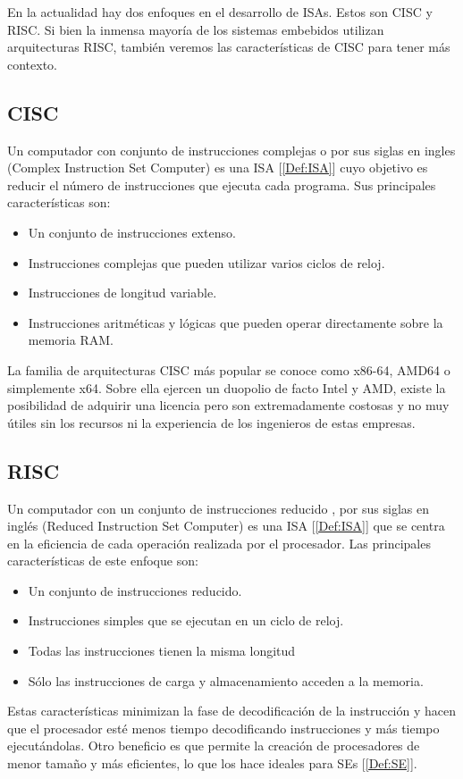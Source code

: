 En la actualidad hay dos enfoques en el desarrollo de ISAs. Estos son CISC y RISC. Si bien la inmensa mayoría de los sistemas embebidos utilizan arquitecturas RISC, también veremos las características de CISC para tener más contexto.

\subsection{CISC}
Un computador con conjunto de instrucciones complejas o  por sus siglas en ingles (Complex Instruction Set Computer) es una ISA [\ref{Def:ISA}] cuyo objetivo es reducir el número de instrucciones que ejecuta cada programa. Sus principales características son:
\begin{itemize}
    \item Un conjunto de instrucciones extenso.
    \item Instrucciones complejas que pueden utilizar varios ciclos de reloj.
    \item Instrucciones de longitud variable.
    \item Instrucciones aritméticas y lógicas que pueden operar directamente sobre la memoria RAM.
\end{itemize}

La familia de arquitecturas CISC más popular se conoce como x86-64, AMD64 o simplemente x64. Sobre ella ejercen un duopolio de facto Intel y AMD, existe la posibilidad de adquirir una licencia pero son extremadamente costosas y no muy útiles sin los recursos ni la experiencia de los ingenieros de estas empresas.

\subsection{RISC}
Un computador con un conjunto de instrucciones reducido , por sus siglas en inglés (Reduced Instruction Set Computer) es una ISA [\ref{Def:ISA}] que se centra en la eficiencia de cada operación realizada por el procesador. Las principales características de este enfoque son:
\begin{itemize}
    \item Un conjunto de instrucciones reducido.
    \item Instrucciones simples que se ejecutan en un ciclo de reloj.
    \item Todas las instrucciones tienen la misma longitud
    \item Sólo las instrucciones de carga y almacenamiento acceden a la memoria.
\end{itemize}
Estas características minimizan la fase de decodificación de la instrucción y hacen que el procesador esté menos tiempo decodificando instrucciones y más tiempo ejecutándolas. Otro beneficio es que permite la creación de procesadores de menor tamaño y más eficientes, lo que los hace ideales para SEs [\ref{Def:SE}]. 

